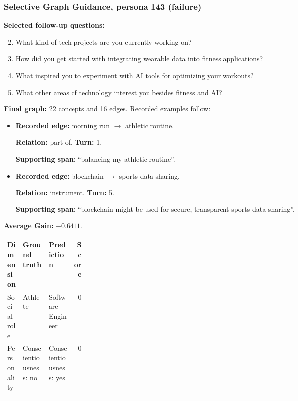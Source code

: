 \documentclass{ieeeaccess}
\begin{document}
\begin{multicols*}{2}
\subsubsection{Selective Graph Guidance, persona 143 (failure)}
\noindent\textbf{Selected follow-up questions:}\par\nopagebreak[4]
\begin{enumerate}
\setcounter{enumi}{1}
\item What kind of tech projects are you currently working on?
\item How did you get started with integrating wearable data into fitness applications?
\item What inspired you to experiment with AI tools for optimizing your workouts?
\item What other areas of technology interest you besides fitness and AI?
\end{enumerate}
\noindent\textbf{Final graph:} 22 concepts and 16 edges. Recorded examples follow:\par\nopagebreak[4]
\begin{itemize}
\item \textbf{Recorded edge:} morning run $\rightarrow$ athletic routine.
\par\textbf{Relation:} part-of. \textbf{Turn:} 1.
\par\textbf{Supporting span:} ``balancing my athletic routine''.
\item \textbf{Recorded edge:} blockchain $\rightarrow$ sports data sharing.
\par\textbf{Relation:} instrument. \textbf{Turn:} 5.
\par\textbf{Supporting span:} ``blockchain might be used for secure, transparent sports data sharing''.
\end{itemize}
\noindent\begin{minipage}{\linewidth}
\noindent\textbf{Average Gain:} $-0.6411$.\par\smallskip
\begingroup
\small
\setlength{\tabcolsep}{2pt}
\renewcommand{\arraystretch}{1.12}
\noindent\begin{tabularx}{\linewidth}{@{}p{0.19\linewidth}>{\raggedright\arraybackslash}X>{\raggedright\arraybackslash}Xr@{}}
\toprule
Dimension & Ground truth & Prediction & Score \\
\midrule
Social role & Athlete & Software Engineer & 0 \\
\addlinespace[2pt]
Personality & Conscientiousness: no & Conscientiousness: yes & 0 \\
\addlinespace[2pt]

\end{tabularx}
\end{minipage}
\end{multicols*}
\end{document}
